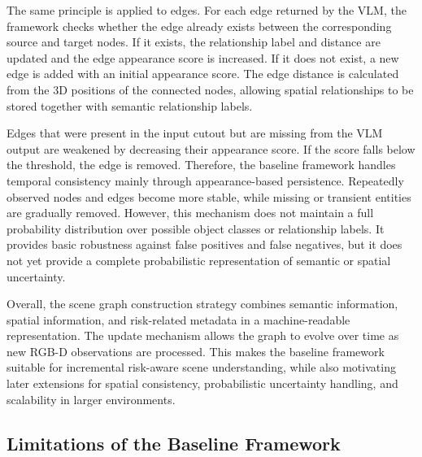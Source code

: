{The same principle is applied to edges. For each edge returned by the VLM, the framework checks whether the edge already exists between the corresponding source and target nodes. If it exists, the relationship label and distance are updated and the edge appearance score is increased. If it does not exist, a new edge is added with an initial appearance score. The edge distance is calculated from the 3D positions of the connected nodes, allowing spatial relationships to be stored together with semantic relationship labels.

Edges that were present in the input cutout but are missing from the VLM output are weakened by decreasing their appearance score. If the score falls below the threshold, the edge is removed. Therefore, the baseline framework handles temporal consistency mainly through appearance-based persistence. Repeatedly observed nodes and edges become more stable, while missing or transient entities are gradually removed. However, this mechanism does not maintain a full probability distribution over possible object classes or relationship labels. It provides basic robustness against false positives and false negatives, but it does not yet provide a complete probabilistic representation of semantic or spatial uncertainty.

Overall, the scene graph construction strategy combines semantic information, spatial information, and risk-related metadata in a machine-readable representation. The update mechanism allows the graph to evolve over time as new RGB-D observations are processed. This makes the baseline framework suitable for incremental risk-aware scene understanding, while also motivating later extensions for spatial consistency, probabilistic uncertainty handling, and scalability in larger environments.

}


\subsection{Limitations of the Baseline Framework}

